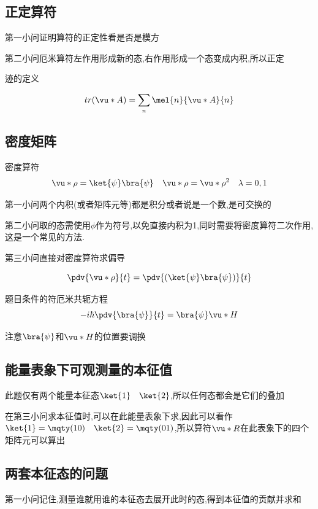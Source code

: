         \subsection{正定算符}
            第一小问证明算符的正定性看是否是模方

            第二小问厄米算符左作用形成新的态,右作用形成一个态变成内积,所以正定

            \begin{formal}
                迹的定义

                $$ tr(\vu*{A}) = \sum_{n} \mel{n}{\vu*{A}}{n} $$
            \end{formal}
        \subsection{密度矩阵}

        \begin{formal}
            密度算符
            $$ \vu*{\rho} = \ket{\psi} \bra{\psi} \quad \vu*{\rho} =  \vu*{\rho}^{2} \quad \lambda = 0,1$$
        \end{formal}
            第一小问两个内积(或者矩阵元等)都是积分或者说是一个数,是可交换的
            
            第二小问取的态需使用$\phi$作为符号,以免直接内积为1,同时需要将密度算符二次作用,这是一个常见的方法.

            第三小问直接对密度算符求偏导

            $$ \pdv{\vu*{\rho}}{t} = \pdv{(\ket{\psi} \bra{\psi})}{t} $$

            题目条件的符厄米共轭方程
            $$ -i\hbar \pdv{\bra{\psi}}{t} = \bra{\psi} \vu*{H}  $$

            注意$\bra{\psi}$和$\vu*{H}$的位置要调换
        \subsection{能量表象下可观测量的本征值}
            此题仅有两个能量本征态$\ket{1} \quad \ket{2}$,所以任何态都会是它们的叠加

            在第三小问求本征值时,可以在此能量表象下求,因此可以看作$\ket{1} = \mqty(1 \\ 0) \quad \ket{2} = \mqty(0 \\ 1)$,所以算符$\vu*{R}$在此表象下的四个矩阵元可以算出

        \subsection{两套本征态的问题}
            第一小问记住,测量谁就用谁的本征态去展开此时的态,得到本征值的贡献并求和

